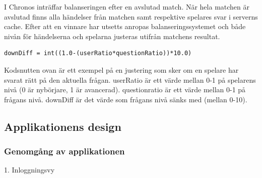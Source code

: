 \documentclass[a4paper, 11pt]{article}
\begin{document}
I Chronos inträffar balanseringen efter en avslutad match. När hela matchen är avslutad finns alla händelser från matchen samt respektive spelares svar i serverns cache. Efter att en vinnare har utsetts anropas balanseringssystemet och både nivån för händelserna och spelarna justeras utifrån matchens resultat.

\begin{verbatim}
downDiff = int((1.0-(userRatio*questionRatio))*10.0)
\end{verbatim}

Kodsnutten ovan är ett exempel på en justering som sker om en spelare har svarat rätt på den aktuella frågan. userRatio är ett värde mellan 0-1 på spelarens nivå (0 är nybörjare, 1 är avancerad). questionratio är ett värde mellan 0-1 på frågans nivå. downDiff är det värde som frågans nivå sänks med (mellan 0-10). 

\pagebreak
\subsection{Applikationens design}

\subsubsection{Genomgång av applikationen}

\large \textup{1. Inloggningsvy}
\end{document}
